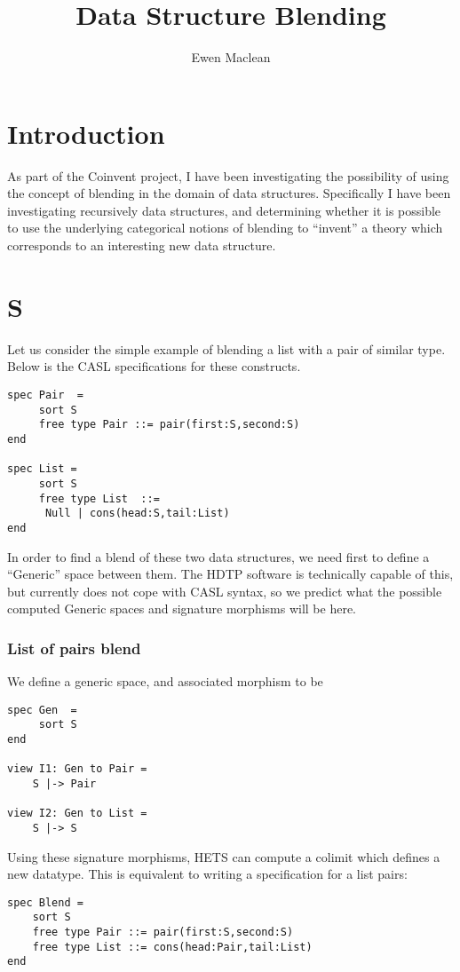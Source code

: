 \documentclass{my-blue-book}
\title{Data Structure Blending}
\author{Ewen Maclean}
\begin{document}
\maketitle

\section{Introduction}

As part of the Coinvent project, I have been investigating the possibility of using the concept of blending in the domain of data structures. Specifically I have been investigating recursively data structures, and determining whether it is possible to use the underlying categorical notions of blending to ``invent'' a theory which corresponds to an interesting new data structure.

\section{S}

Let us consider the simple example of blending a list with a pair of similar type. Below is the CASL specifications for these constructs. 
\begin{verbatim}
spec Pair  = 
     sort S
     free type Pair ::= pair(first:S,second:S)
end

spec List =
     sort S
     free type List  ::=
	  Null | cons(head:S,tail:List)
end
\end{verbatim}
\noindent In order to find a blend of these two data structures, we need first to define a ``Generic'' space between them. The HDTP software is technically capable of this, but currently does not cope with CASL syntax, so we predict what the possible computed Generic spaces and signature morphisms will be here.

\subsubsection{List of pairs blend}

We define a generic space, and associated morphism to be
\begin{verbatim}
spec Gen  = 
     sort S
end

view I1: Gen to Pair = 
    S |-> Pair

view I2: Gen to List =
    S |-> S
\end{verbatim}
\noindent Using these signature morphisms, HETS can compute a colimit which defines a new datatype. This is equivalent to writing a specification for a list pairs:
\begin{verbatim}
spec Blend = 
    sort S
    free type Pair ::= pair(first:S,second:S)
    free type List ::= cons(head:Pair,tail:List)
end
\end{verbatim}
\end{document}
